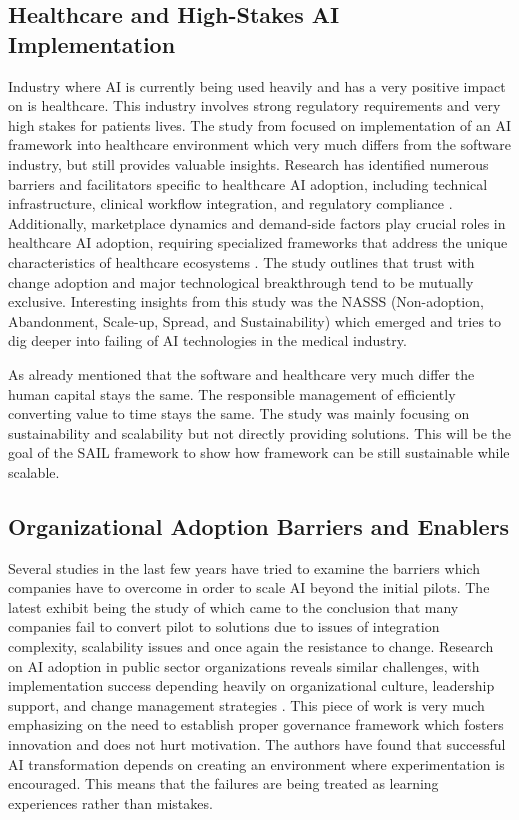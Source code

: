 \documentclass[]{imc-inf}
\begin{document}
\subsection{Healthcare and High-Stakes AI Implementation}


Industry where AI is currently being used heavily and has a very positive impact on is healthcare. This industry involves strong regulatory requirements and very high stakes for patients lives. The study from \citep{Gama2022} focused on implementation of an AI framework into healthcare environment which very much differs from the software industry, but still provides valuable insights. Research has identified numerous barriers and facilitators specific to healthcare AI adoption, including technical infrastructure, clinical workflow integration, and regulatory compliance \citep{Hassan2024}. Additionally, marketplace dynamics and demand-side factors play crucial roles in healthcare AI adoption, requiring specialized frameworks that address the unique characteristics of healthcare ecosystems \citep{Singh2025}. The study outlines that trust with change adoption and major technological breakthrough tend to be mutually exclusive. Interesting insights from this study was the NASSS  (Non-adoption, Abandonment, Scale-up, Spread, and Sustainability) which emerged and tries to dig deeper into failing of AI technologies in the medical industry. 

As already mentioned that the software and healthcare very much differ the human capital stays the same. The responsible management of efficiently converting value to time stays the same. The study was mainly focusing on sustainability and scalability but not directly providing solutions. This will be the goal of the SAIL framework to show how framework can be still sustainable while scalable.



\subsection{Organizational Adoption Barriers and Enablers}

Several studies in the last few years have tried to examine the barriers which companies have to overcome in order to scale AI beyond the initial pilots. The latest exhibit being the study of \citep{Praveen2024} which came to the conclusion that many companies fail to convert pilot to solutions due to issues of integration complexity, scalability issues and once again the resistance to change. Research on AI adoption in public sector organizations reveals similar challenges, with implementation success depending heavily on organizational culture, leadership support, and change management strategies \citep{Chen2024}. This piece of work is very much emphasizing on the need to establish proper governance framework which fosters innovation and does not hurt motivation. The authors have found that successful AI transformation depends on creating an environment where experimentation is encouraged. This means that the failures are being treated as learning experiences rather than mistakes.
\end{document}
